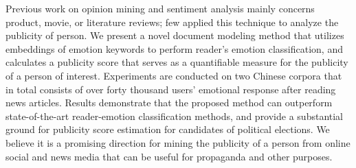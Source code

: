 Previous work on opinion mining and sentiment analysis mainly concerns product, movie, or literature reviews; few applied this technique to analyze the publicity of person. We present a novel document modeling method that utilizes embeddings of emotion keywords to perform reader's emotion classification, and calculates a publicity score that serves as a quantifiable measure for the publicity of a person of interest. Experiments are conducted on two Chinese corpora that in total consists of over forty thousand users' emotional response after reading news articles. Results demonstrate that the proposed method can outperform state-of-the-art reader-emotion classification methods, and provide a substantial ground for publicity score estimation for candidates of political elections. We believe it is a promising direction for mining the publicity of a person from online social and news media that can be useful for propaganda and other purposes.
